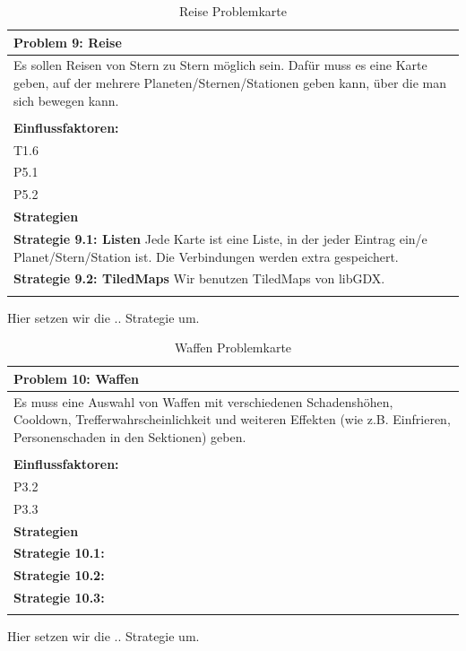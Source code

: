 \documentclass[fontsize=12pt,paper=a4,twoside]{scrartcl}
\begin{document}
\begin{table}[H]
    \centering
    \begin{tabular}{|p{15cm}|}
    \hline
          \textbf{Problem 9: Reise}  \\ \hline
	Es sollen Reisen von Stern zu Stern möglich sein. Dafür muss es eine Karte geben, auf der mehrere Planeten/Sternen/Stationen geben kann, über die man sich bewegen kann. \\
         \\ \hline
          \textbf{Einflussfaktoren: } \\
	T1.6 \\
	P5.1 \\
	P5.2 \\
          \hline
          \textbf{Strategien} \\ \hline
            {}          
           \label{strategie:9.1}     
          \textbf{Strategie 9.1: Listen} Jede Karte ist eine Liste, in der jeder Eintrag ein/e Planet/Stern/Station ist. Die Verbindungen werden extra gespeichert.  \\        
  {}          
           \label{strategie:9.2}              
          \textbf{Strategie 9.2: TiledMaps} Wir benutzen TiledMaps von libGDX.  \\
	 \\ \hline
    \end{tabular}

    \caption{Reise Problemkarte}
    \label{tab:ProblemKarte9}
\end{table}
Hier setzen wir die .. Strategie um. \\

\begin{table}[H]
    \centering
    \begin{tabular}{|p{15cm}|}
    \hline
          \textbf{Problem 10: Waffen}  \\ \hline
	Es muss eine Auswahl von Waffen mit verschiedenen Schadenshöhen, Cooldown, Trefferwahrscheinlichkeit und weiteren Effekten (wie z.B. Einfrieren, Personenschaden in den Sektionen) geben. \\
         \\ \hline
          \textbf{Einflussfaktoren: } \\
	P3.2 \\
	P3.3 \\
          \hline
          \textbf{Strategien} \\ \hline
            {}          
           \label{strategie:10.1}     
          \textbf{Strategie 10.1:}  \\        
  {}          
           \label{strategie:10.2}              
          \textbf{Strategie 10.2:}  \\
	 {}          
           \label{strategie:10.3}     
          \textbf{Strategie 10.3: }  \\ 
	 \\ \hline
    \end{tabular}

    \caption{Waffen Problemkarte}
    \label{tab:ProblemKarte10}
\end{table}
Hier setzen wir die .. Strategie um. \\
\end{document}
